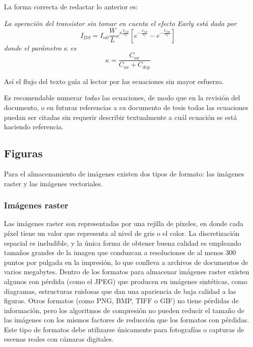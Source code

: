 La forma correcta de redactar lo anterior es: 

\textsl{La operación del transistor sin tomar en cuenta el efecto Early está
  dada por}
\begin{equation} \label{eq:ej3}
  I_{DS}
  =
  I_{n0} \frac{W}{L}e^{\kappa \frac{V_{GB}}{v_t}}
  \left[
    e^{-\frac{V_{SB}}{v_t}}
    -
    e^{-\frac{V_{DB}}{v_t}}
  \right]
\end{equation}
\textsl{donde el parámetro $\kappa$ es}
\begin{equation} \label{eq:ej4}
  \kappa = \frac{C_{ox}}{C_{ox}+C_{dep}}
\end{equation}

Así el flujo del texto guía al lector por las ecuaciones sin mayor esfuerzo.

Es recomendable numerar \emph{todas} las ecuaciones, de modo que en la revisión
del documento, o en futuras referencias a su documento de tesis todas las
ecuaciones puedan ser citadas sin requerir describir textualmente a cuál
ecuación se está haciendo referencia.

\subsection{Figuras}

Para el almacenamiento de imágenes existen dos tipos de formato: las imágenes
raster y las imágenes vectoriales.

\subsubsection{Imágenes raster}

Las imágenes raster son representadas por una rejilla de píxeles, en donde cada
píxel tiene un valor que representa al nivel de gris o el color. La
discretización espacial es ineludible, y la única forma de obtener buena
calidad es empleando tamaños grandes de la imagen que conduzcan a resoluciones
de al menos 300 puntos por pulgada en la impresión, lo que conlleva a archivos
de documentos de varios megabytes. Dentro de los formatos para almacenar
imágenes raster existen algunos con pérdida (como el JPEG) que producen en
imágenes sintéticas, como diagramas, estructuras ruidosas que dan una
apariencia de baja calidad a las figuras. Otros formatos (como PNG, BMP, TIFF o
GIF) no tiene pérdidas de información, pero los algoritmos de compresión no
pueden reducir el tamaño de las imágenes con los mismos factores de reducción
que los formatos con pérdidas. Este tipo de formatos debe utilizarse únicamente
para fotografías o capturas de escenas reales con cámaras digitales.

